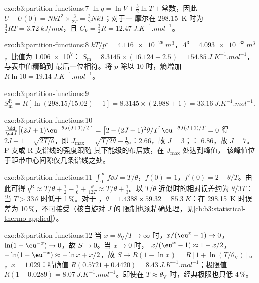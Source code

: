 \begin{solution}{exo:b3:partition-functions:7}
$\ln q = \ln V + \frac32\ln T + \text{常数}$，因此 $U - U(0) = NkT^2 \times \frac{3}{2T} = \frac32NkT$；对于一
摩尔在 \qty{298.15}{K} 时为 $\frac32RT = \qty{3.72}{kJ/mol}$，且 $C_V = \frac32R = \qty{12.47}{J.K^{-1}.mol^{-1}}$。
\end{solution}

\begin{solution}{exo:b3:partition-functions:8}
$kT/p^\circ = \qty{4.116e-26}{m^3}$，$\Lambda^3 = \qty{4.093e-33}{m^3}$，比值为 \num{1.006e7}：
$S_{\mathrm m} = 8.3145 \times (16.124 + 2.5) = \qty{154.85}{J.K^{-1}.mol^{-1}}$，与表中值精确到
最后一位相符。将 $p$ 除以 10 时，熵增加 $R\ln10 = \qty{19.14}{J.K^{-1}.mol^{-1}}$。
\end{solution}

\begin{solution}{exo:b3:partition-functions:9}
$S^{\mathrm R}_{\mathrm m} = R[\ln(298.15/15.02) + 1] = 8.3145 \times (2.988 + 1) = \qty{33.16}{J.K^{-1}.mol^{-1}}$.
\end{solution}

\begin{solution}{exo:b3:partition-functions:10}
$\frac{\dd}{\dd J}\bigl[(2J+1)\eu^{-\theta J(J+1)/T}\bigr] = \bigl[2 - (2J+1)^2\theta/T\bigr]\eu^{-\theta J(J+1)/T} = 0$ 得
$2J + 1 = \sqrt{2T/\theta}$，即 $J_{\max} = \sqrt{T/2\theta} - \frac12$。：2.66，故 $J = 3$；：
6.86，故 $J = 7$。P 支或 R 支谱线的强度跟随
其下能级的布居数，在 $J_{\max}$ 处达到峰值，
该峰值位于距带中心间隙仅几条谱线之处。
\end{solution}

\begin{solution}{exo:b3:partition-functions:11}
$\int_0^\infty f\dd J = T/\theta$，$f(0) = 1$，$f'(0) = 2 - \theta/T$。由此可得 $q^{\mathrm R} \approx T/\theta + \frac12 -
\frac16 + \frac{\theta}{12T} \approx T/\theta + \frac13$。以 $T/\theta$ 近似时的相对误差约为 $\theta/3T$：
当 $T > 33\,\theta$ 时低于 1\,\%。对于 ，$\theta = 1.4388 \times 59.32 = \qty{85.3}{K}$：在
\qty{298.15}{K} 时误差为 10\,\%，不可接受（核自旋对 $J$ 的
限制也须精确处理，见\cref{ch:b3:statistical-thermo-applied}）。
\end{solution}

\begin{solution}{exo:b3:partition-functions:12}
当 $x = \theta_{\mathrm V}/T \to \infty$ 时，$x/(\eu^x - 1) \to 0$，$\ln(1 - \eu^{-x}) \to 0$，故 $S \to 0$。当 $x \to 0$ 时，
$x/(\eu^x - 1) \approx 1 - x/2$，$-\ln(1 - \eu^{-x}) \approx -\ln x + x/2$，故 $S \to R(1 - \ln x) = R[1 + \ln(T/\theta_{\mathrm V})]$。
，$x = 1.029$：精确值 $R(0.5721 + 0.4420) = \qty{8.43}{J.K^{-1}.mol^{-1}}$；极限值 $R(1 - 0.0289) =
\qty{8.07}{J.K^{-1}.mol^{-1}}$。即使在 $T \approx \theta_{\mathrm V}$ 时，经典极限也只低 4\,\%。
\end{solution}

